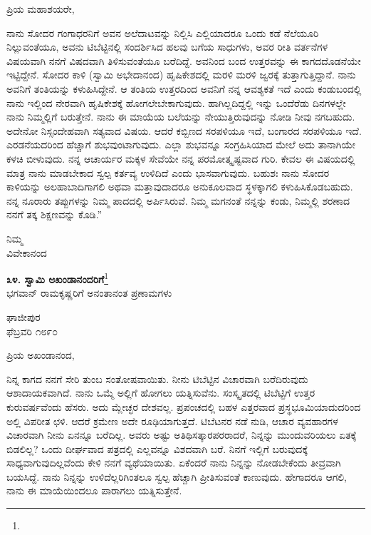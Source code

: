 \noindent
ಪ್ರಿಯ ಮಹಾಶಯರೇ,

ನಾನು ಸೋದರ ಗಂಗಾಧರನಿಗೆ ಅವನ ಅಲೆದಾಟವನ್ನು ನಿಲ್ಲಿಸಿ ಎಲ್ಲಿಯಾದರೂ ಒಂದು ಕಡೆ ನೆಲೆಯೂರಿ ನಿಲ್ಲುವಂತೆಯೂ, ಅವನು ಟಿಬೆಟ್ಟಿನಲ್ಲಿ ಸಂದರ್ಶಿಸಿದ ಹಲವು ಬಗೆಯ ಸಾಧುಗಳು, ಅವರ ರೀತಿ ವರ್ತನೆಗಳ ವಿಷಯವಾಗಿ ನನಗೆ ವಿಷದವಾಗಿ ತಿಳಿಸುವಂತೆಯೂ ಬರೆದಿದ್ದೆ. ಅವನಿಂದ ಬಂದ ಉತ್ತರವನ್ನು ಈ ಕಾಗದದೊಡನೆಯೇ ಇಟ್ಟಿದ್ದೇನೆ. ಸೋದರ ಕಾಳಿ (ಸ್ವಾಮಿ ಅಭೇದಾನಂದ) ಹೃಷಿಕೇಶದಲ್ಲಿ ಮರಳಿ ಮರಳಿ ಜ್ವರಕ್ಕೆ ತುತ್ತಾಗುತ್ತಿದ್ದಾನೆ. ನಾನು ಅವನಿಗೆ ತಂತಿಯನ್ನು ಕಳುಹಿಸಿದ್ದೇನೆ. ಆ ತಂತಿಯ ಉತ್ತರದಿಂದ ಅವನಿಗೆ ನನ್ನ ಆವಶ್ಯಕತೆ ಇದೆ ಎಂದು ಕಂಡುಬಂದಲ್ಲಿ ನಾನು ಇಲ್ಲಿಂದ ನೇರವಾಗಿ ಹೃಷಿಕೇಶಕ್ಕೆ ಹೋಗಲೇಬೇಕಾಗುವುದು. ಹಾಗಿಲ್ಲದಿದ್ದಲ್ಲಿ ಇನ್ನು ಒಂದೆರೆಡು ದಿನಗಳಲ್ಲೇ ನಾನು ನಿಮ್ಮಲ್ಲಿಗೆ ಬರುತ್ತೇನೆ. ನಾನು ಈ ಮಾಯೆಯ ಬಲೆಯನ್ನು ನೇಯುತ್ತಿರುವುದನ್ನು ನೋಡಿ ನೀವು ನಗಬಹುದು. ಅದೇನೋ ನಿಸ್ಸಂದೇಹವಾಗಿ ಸತ್ಯವಾದ ವಿಷಯ. ಆದರೆ ಕಬ್ಬಿಣದ ಸರಪಳಿಯೂ ಇದೆ, ಬಂಗಾರದ ಸರಪಳಿಯೂ ಇದೆ. ಎರಡನೆಯದರಿಂದ ಹೆಚ್ಚಾಗೆ ಶುಭವುಂಟಾಗುವುದು. ಎಲ್ಲಾ ಶುಭವನ್ನೂ ಸಂಗ್ರಹಿಸಿಯಾದ ಮೇಲೆ ಅದು ತಾನಾಗಿಯೇ ಕಳಚಿ ಬೀಳುವುದು. ನನ್ನ ಆಚಾರ್ಯರ ಮಕ್ಕಳ ಸೇವೆಯೇ ನನ್ನ ಪರಮೋತ್ಕೃಷ್ಟವಾದ ಗುರಿ. ಕೇವಲ ಈ ವಿಷಯದಲ್ಲಿ ಮಾತ್ರ ನಾನು ಮಾಡಬೇಕಾದ ಸ್ವಲ್ಪ ಕರ್ತವ್ಯ ಉಳಿದಿದೆ ಎಂದು ಭಾಸವಾಗುವುದು. ಬಹುಶಃ ನಾನು ಸೋದರ ಕಾಳಿಯನ್ನು ಅಲಹಾಬಾದಿಗಾಗಲಿ ಅಥವಾ ಮತ್ತಾವುದಾದರೂ ಅನುಕೂಲವಾದ ಸ್ಥಳಕ್ಕಾಗಲಿ ಕಳುಹಿಸಿಕೊಡಬಹುದು. ನನ್ನ ನೂರಾರು ತಪ್ಪುಗಳನ್ನು ನಿಮ್ಮ ಪಾದದಲ್ಲಿ ಅರ್ಪಿಸಿರುವೆ. ನಿಮ್ಮ ಮಗನಂತೆ ನನ್ನನ್ನು ಕಂಡು, ನಿಮ್ಮಲ್ಲಿ ಶರಣಾದ ನನಗೆ ತಕ್ಕ ಶಿಕ್ಷಣವನ್ನು ಕೊಡಿ.”

{\flushright
ನಿಮ್ಮ\\ವಿವೇಕಾನಂದ\par}

\newpage

\begin{center}
\textbf{೩೪. ಸ್ವಾಮಿ ಅಖಂಡಾನಂದರಿಗೆ}\footnote{}\\ ಭಗವಾನ್ ರಾಮಕೃಷ್ಣರಿಗೆ ಅನಂತಾನಂತ ಪ್ರಣಾಮಗಳು
\end{center}

\vspace{-0.6cm}


\begin{flushright}
ಘಾಜೀಪುರ\\ಫೆಬ್ರವರಿ ೧೮೯೦
\end{flushright}

\vspace{-0.6cm}

\noindent
ಪ್ರಿಯ ಅಖಂಡಾನಂದ,

ನಿನ್ನ ಕಾಗದ ನನಗೆ ಸೇರಿ ತುಂಬ ಸಂತೋಷವಾಯಿತು. ನೀನು ಟಿಬೆಟ್ಟಿನ ವಿಚಾರವಾಗಿ ಬರೆದಿರುವುದು ಆಶಾದಾಯಕವಾಗಿದೆ. ನಾನು ಒಮ್ಮೆ ಅಲ್ಲಿಗೆ ಹೋಗಲು ಯತ್ನಿಸುವೆನು. ಸಂಸ್ಕೃತದಲ್ಲಿ ಟಿಬೆಟ್ಟಿಗೆ ಉತ್ತರ ಕುರುವರ್ಷವೆಂದು ಹೆಸರು. ಅದು ಮ್ಲೇಚ್ಛರ ದೇಶವಲ್ಲ. ಪ್ರಪಂಚದಲ್ಲಿ ಬಹಳ ಎತ್ತರವಾದ ಪ್ರಸ್ಥಭೂಮಿಯಾದುದರಿಂದ ಅಲ್ಲಿ ವಿಪರೀತ ಛಳಿ. ಆದರೆ ಕ್ರಮೇಣ ಅದೇ ರೂಢಿಯಾಗುತ್ತದೆ. ಟಿಬೆಟನರ ನಡೆ ನುಡಿ, ಆಚಾರ ವ್ಯವಹಾರಗಳ ವಿಚಾರವಾಗಿ ನೀನು ಏನನ್ನೂ ಬರೆದಿಲ್ಲ. ಅವರು ಅಷ್ಟು ಅತಿಥಿಸತ್ಕಾರಪರರಾದರೆ, ನಿನ್ನನ್ನು ಮುಂದುವರಿಯಲು ಏತಕ್ಕೆ ಬಿಡಲಿಲ್ಲ? ಒಂದು ದೀರ್ಘವಾದ ಪತ್ರದಲ್ಲಿ ಎಲ್ಲವನ್ನೂ ವಿಶದವಾಗಿ ಬರೆ. ನಿನಗೆ ಇಲ್ಲಿಗೆ ಬರುವುದಕ್ಕೆ ಸಾಧ್ಯವಾಗುವುದಿಲ್ಲವೆಂದು ಕೇಳಿ ನನಗೆ ವ್ಯಥೆಯಾಯಿತು. ಏಕೆಂದರೆ ನಾನು ನಿನ್ನನ್ನು ನೋಡಬೇಕೆಂದು ತೀವ್ರವಾಗಿ ಬಯಸಿದ್ದೆ. ನಾನು ನಿನ್ನನ್ನು ಉಳಿದೆಲ್ಲರಿಗಿಂತಲೂ ಸ್ವಲ್ಪ ಹೆಚ್ಚಾಗಿ ಪ್ರೀತಿಸುವಂತೆ ಕಾಣುವುದು. ಹೇಗಾದರೂ ಆಗಲಿ, ನಾನು ಈ ಮಾಯೆಯಿಂದಲೂ ಪಾರಾಗಲು ಯತ್ನಿಸುತ್ತೇನೆ.

